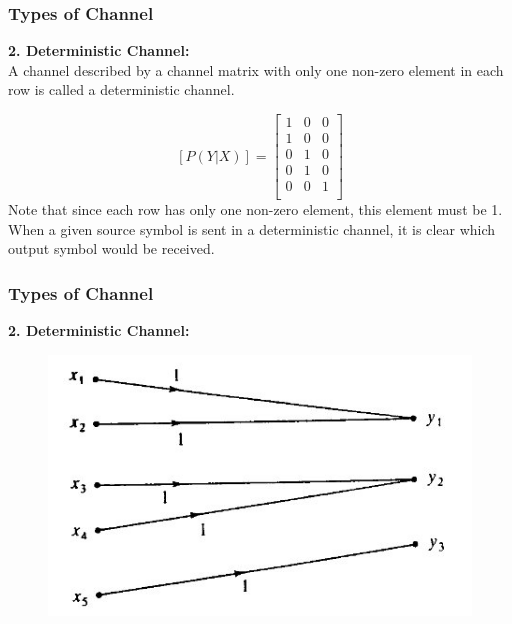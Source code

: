 \documentclass[a4]{beamer}
\begin{document}
\begin{frame}
\frametitle{Types of Channel}
\textbf{2. Deterministic Channel:}\\
A channel described by a channel matrix with only one non-zero element in each row is called a deterministic channel.

\[  [P(Y|X)]  =  \left[ \begin{array}{ccc}
1   & 0 &0 \\
1  & 0 &0\\
0  & 1 &0\\
0  & 1& 0 \\
0  & 0& 1 \\
\end{array} \right]  \]
Note that since each row has only one non-zero element, this element must be 1. When a given source symbol is sent in a deterministic channel, it is clear which output symbol would be received.
\end{frame}

\begin{frame}
\frametitle{Types of Channel}
\textbf{2. Deterministic Channel:}\\
\begin{figure}
\centering
\includegraphics[width=0.7\linewidth]{images/11Bdeterministic}
\caption{}
\label{fig:11Bdeterministic}
\end{figure}

\end{frame}
\end{document}
